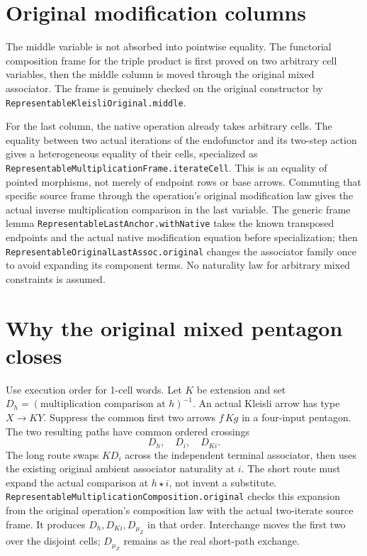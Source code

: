 \documentclass[11pt]{article}
\newcommand{\code}[1]{\nolinkurl{#1}}
\begin{document}
\section*{Original modification columns}
The middle variable is not absorbed into pointwise equality. The
functorial composition frame for the triple product is first proved on two
arbitrary cell variables, then the middle column is moved through the
original mixed associator. The frame is genuinely checked on the original
constructor by \code{RepresentableKleisliOriginal.middle}.

For the last column, the native operation already takes arbitrary cells.
The equality between two actual iterations of the endofunctor and its
two-step action gives a heterogeneous equality of their cells, specialized
as \code{RepresentableMultiplicationFrame.iterateCell}. This is an equality
of pointed morphisms, not merely of endpoint rows or base arrows.
Commuting that specific source frame through the operation's original
modification law gives the actual inverse multiplication comparison
in the last variable. The generic frame lemma \code{RepresentableLastAnchor.withNative}
takes the known transposed endpoints and the actual native modification
equation before specialization; then \code{RepresentableOriginalLastAssoc.original}
changes the associator family once to avoid expanding its component terms.
No naturality law for arbitrary mixed constraints is assumed.

\section*{Why the original mixed pentagon closes}
Use execution order for 1-cell words. Let \(K\) be extension and set
\(D_h=(\text{multiplication comparison at }h)^{-1}\). An actual
Kleisli arrow has type \(X\to K Y\). Suppress the common first two arrows
\(f\,Kg\) in a four-input pentagon. The two resulting paths have common
ordered crossings
\[
     D_h,\quad D_i,\quad D_{Ki}.
\]
The long route swaps \(K D_i\) across the independent terminal associator,
then uses the existing original ambient associator naturality at \(i\).
The short route must expand the actual comparison at \(h\star i\), not
invent a substitute. \code{RepresentableMultiplicationComposition.original}
checks this expansion from the original operation's composition law with
the actual two-iterate source frame. It produces \(D_h,D_{Ki},D_{\mu_Z}\)
in that order. Interchange moves the first two over the disjoint cells;
\(D_{\mu_Z}\) remains as the real short-path exchange.
\end{document}
